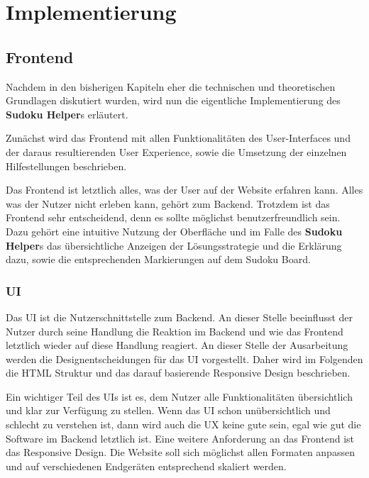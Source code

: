 
\part{Implementierung}

\chapter{Frontend}
Nachdem in den bisherigen Kapiteln eher die technischen und theoretischen Grundlagen diskutiert wurden, wird nun die eigentliche Implementierung des \textbf{Sudoku Helper}s erläutert.

Zunächst wird das Frontend mit allen Funktionalitäten des User-Interfaces und der daraus resultierenden User Experience, sowie die Umsetzung der einzelnen Hilfestellungen beschrieben.

Das Frontend ist letztlich alles, was der User auf der Website erfahren kann. Alles was der Nutzer nicht erleben kann, gehört zum Backend. Trotzdem ist das Frontend sehr entscheidend, denn es sollte möglichst benutzerfreundlich sein. Dazu gehört eine intuitive Nutzung der Oberfläche und im Falle des \textbf{Sudoku Helper}s das übersichtliche Anzeigen der Lösungsstrategie und die Erklärung dazu, sowie die entsprechenden Markierungen auf dem Sudoku Board.

\section{\acl{UI}}
Das \ac{UI} ist die Nutzerschnittstelle zum Backend. An dieser Stelle beeinflusst der Nutzer durch seine Handlung die Reaktion im Backend und wie das Frontend letztlich wieder auf diese Handlung reagiert. An dieser Stelle der Ausarbeitung werden die Designentscheidungen für das \ac{UI} vorgestellt. Daher wird im Folgenden die \ac{HTML} Struktur und das darauf basierende Responsive Design beschrieben.

Ein wichtiger Teil des \acp{UI} ist es, dem Nutzer alle Funktionalitäten übersichtlich und klar zur Verfügung zu stellen. Wenn das \ac{UI} schon unübersichtlich und schlecht zu verstehen ist, dann wird auch die \acs{UX} keine gute sein, egal wie gut die Software im Backend letztlich ist. Eine weitere Anforderung an das Frontend ist das Responsive Design. Die Website soll sich möglichst allen Formaten anpassen und auf verschiedenen Endgeräten entsprechend skaliert werden.

